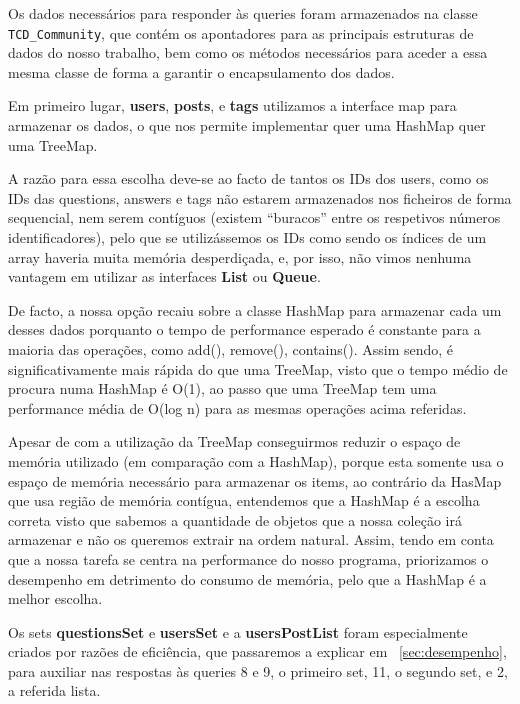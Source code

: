 \documentclass[a4paper]{article}
\begin{document}
\vspace{0.2cm}

Os dados necessários para responder às queries foram armazenados
na classe \texttt{TCD\_Community}, que contém os apontadores para as principais
estruturas de dados do nosso trabalho, bem como os métodos necessários para aceder
a essa mesma classe de forma a garantir o encapsulamento dos dados.


Em primeiro lugar, \textbf{users}, \textbf{posts},
e \textbf{tags} utilizamos a interface map para armazenar os dados,
o que nos permite implementar quer uma HashMap quer uma TreeMap. \par
A razão para essa escolha deve-se ao facto de tantos os IDs dos users, como os
IDs das questions, answers e tags não estarem armazenados nos ficheiros de forma
sequencial, nem serem contíguos (existem ``buracos'' entre os respetivos números
identificadores), pelo que se utilizássemos os IDs como sendo os índices de um
array haveria muita memória desperdiçada, e, por isso, não vimos nenhuma vantagem
em utilizar as interfaces \textbf{List} ou \textbf{Queue}. \par
De facto, a nossa opção recaiu sobre a classe HashMap para armazenar cada um desses
dados porquanto o tempo de performance esperado é constante para a maioria das
operações, como add(), remove(), contains(). Assim sendo, é significativamente
mais rápida do que uma TreeMap, visto que o tempo médio de procura numa HashMap
é O(1), ao passo que uma TreeMap tem uma performance média de O(log n) para as
mesmas operações acima referidas. \par
Apesar de com a utilização da TreeMap conseguirmos reduzir o espaço de memória
utilizado (em comparação com a HashMap), porque esta somente usa o espaço de
memória necessário para armazenar os items, ao contrário da HasMap que usa região
de memória contígua, entendemos que a HashMap é a escolha correta visto que sabemos
a quantidade de objetos que a nossa coleção irá armazenar e não os queremos extrair
na ordem natural. Assim, tendo em conta que a nossa tarefa se centra na performance
do nosso programa, priorizamos o desempenho em detrimento do consumo de memória,
pelo que a HashMap é a melhor escolha.

Os sets \textbf{questionsSet} e \textbf{usersSet} e a \textbf{usersPostList} foram
especialmente criados por razões de eficiência, que passaremos a explicar em
~\ref{sec:desempenho}, para auxiliar nas respostas às queries 8 e 9, o primeiro set,
11, o segundo set, e 2, a referida lista.
\end{document}
